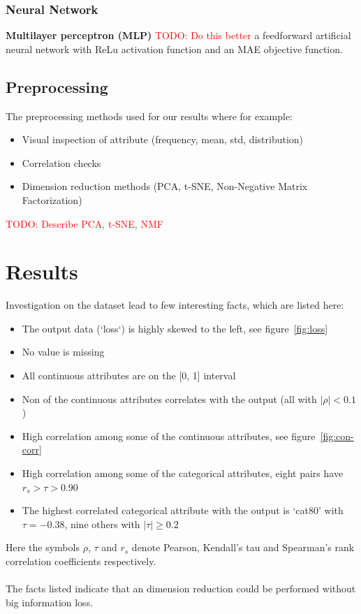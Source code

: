 \documentclass[a4paper]{article}
\newcommand\todo[1]{\textcolor{red}{TODO: #1}}
\begin{document}
\subsubsection{Neural Network}
\textbf{Multilayer perceptron (MLP)} \todo{Do this better} a feedforward artificial neural network with ReLu activation function and an MAE objective function.

\subsection{Preprocessing}
The preprocessing methods used for our results where for example:
\begin{itemize}
    \item Visual inspection of attribute (frequency, mean, std, distribution)
    \item Correlation checks
    \item Dimension reduction methods (PCA, t-SNE, Non-Negative Matrix Factorization)
\end{itemize}

\todo{Describe PCA, t-SNE, NMF}


%

\section{Results}
Investigation on the dataset lead to few interesting facts, which are listed here:
\begin{itemize}
    \item The output data (‘loss‘) is highly skewed to the left, see figure~\ref{fig:loss}
    \item No value is missing
    \item All continuous attributes are on the [0, 1] interval
    \item Non of the continuous attributes correlates with the output (all with $|\rho| < 0.1$)
    \item High correlation among some of the continuous attributes, see figure~\ref{fig:con-corr}
    \item High correlation among some of the categorical attributes, eight pairs have $r_s > \tau > 0.90$
    \item The highest correlated categorical attribute with the output is ‘cat80’ with $\tau=-0.38$, nine others with $|\tau| \geq 0.2$
\end{itemize}
Here the symbols $\rho$, $\tau$ and $r_s$ denote Pearson, Kendall's tau and Spearman’s rank correlation coefficients respectively. \\\\
The facts listed indicate that an dimension reduction could be performed without big information loss.
\end{document}
